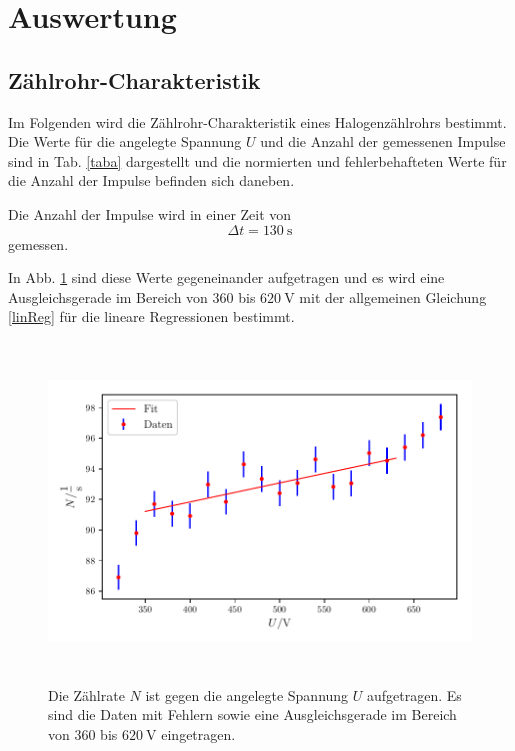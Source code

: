 \section{Auswertung}
\label{sec:Auswertung}


\subsection{Zählrohr-Charakteristik}

Im Folgenden wird die Zählrohr-Charakteristik eines Halogenzählrohrs bestimmt. Die Werte für die angelegte Spannung $U$ und die Anzahl der gemessenen Impulse sind in Tab. \ref{taba} dargestellt und die normierten und fehlerbehafteten Werte für die Anzahl der Impulse befinden sich daneben. 



\noindent Die Anzahl der Impulse wird in einer Zeit von 
\begin{equation*}
    \Delta t = \SI{130}{\second}
\end{equation*}
gemessen. 

\noindent In Abb. \ref{fig1} sind diese Werte gegeneinander aufgetragen und es wird eine Ausgleichsgerade im Bereich von $\num{360}$ bis $\SI{620}{\volt}$ mit der allgemeinen Gleichung \eqref{linReg} für die lineare Regressionen bestimmt. 

\begin{figure}
    \centering
    \includegraphics[width=15cm, height=9cm]{build/plot1.pdf}
    \caption{Die Zählrate $N$ ist gegen die angelegte Spannung $U$ aufgetragen. Es sind die Daten mit Fehlern sowie eine Ausgleichsgerade im Bereich von $\num{360}$ bis $\SI{620}{\volt}$ eingetragen.}
    \label{fig1}
\end{figure}

